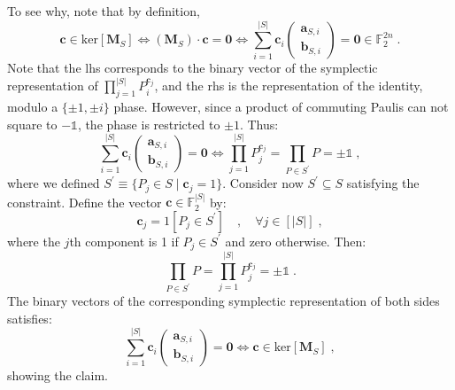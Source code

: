 \documentclass[10pt,aps,pra,twocolumn,floatfix,nofootinbib,superscriptaddress,longbibliography]{revtex4-2}
\newcommand{\1}{\mathbbm{1}}
\begin{document}
    To see why, note that by definition, 
    \begin{equation}
        \mathbf c \in \mathrm{ker}[\mathbf M_S] \Leftrightarrow (\mathbf M_S)\cdot \mathbf c=\mathbf 0 \Leftrightarrow \sum_{i=1}^{|S|} \mathbf c_i \begin{pmatrix}
            \mathbf a_{S,i}\\
            \mathbf b_{S,i}
        \end{pmatrix} = \mathbf 0 \in \mathbb F_2^{2n} \;.
    \end{equation}
    Note that the lhs corresponds to the binary vector of the symplectic representation of $\prod_{j=1}^{|S|}P_i^{\mathbf c_j}$, and the rhs is the representation of the identity, modulo a $\{\pm1,\pm i\}$ phase. However, since a product of commuting Paulis can not square to $-\mathds{1}$, the phase is restricted to $\pm 1$. Thus:
    \begin{equation}
        \sum_{i=1}^{|S|} \mathbf c_i \begin{pmatrix}
            \mathbf a_{S,i}\\
            \mathbf b_{S,i}
        \end{pmatrix} = \mathbf 0 \Leftrightarrow \prod_{j=1}^{|S|}P_j^{\mathbf c_j}  =\prod_{P \in S^\prime}P =\pm\mathds{1}\;,
    \end{equation}
    where we defined $S^\prime \equiv \{P_j \in S\;|\;\mathbf c_j=1\}$. Consider now $S^\prime \subseteq S$ satisfying the constraint. Define the vector $\mathbf c \in \mathbb F_2^{|S|}$ by:
    \begin{equation}
        \mathbf c_j = 1[P_j \in S^\prime] \quad, \quad \forall j \in [|S|]\;,
    \end{equation}
    where the $j$th component is 1 if $P_j \in S^\prime$ and zero otherwise. Then:
    \begin{equation}
        \prod_{P \in S^\prime} P =\prod_{j=1}^{|S|}P_j^{\mathbf c_j} =\pm\mathds{1}\;.
    \end{equation}
    The binary vectors of the corresponding symplectic representation of both sides satisfies:
    \begin{equation}
        \sum_{i=1}^{|S|} \mathbf c_i \begin{pmatrix}
            \mathbf a_{S,i}\\
            \mathbf b_{S,i}
        \end{pmatrix} = \mathbf 0 \Leftrightarrow \mathbf c \in \mathrm{ker}[\mathbf M_S]\;,
    \end{equation}
    showing the claim.
\end{document}
